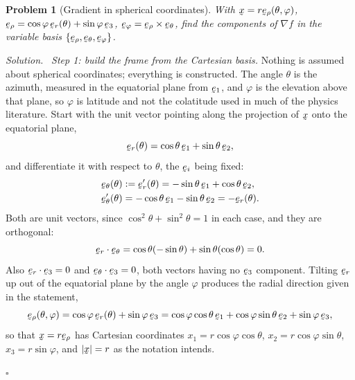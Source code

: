 \documentclass[17pt,a4paper]{extreport}
\DeclareRobustCommand{\vek}[1]{\underaccent{\tilde}{#1}}
\newcommand{\grad}{\nabla}
\newcommand{\bx}{\vek{x}}
\newcommand{\be}{\vek{e}}
\newcommand{\ber}{\vek{e}_{r}}
\renewcommand{\beth}{\vek{e}_{\theta}}
\newcommand{\beph}{\vek{e}_{\varphi}}
\newcommand{\berho}{\vek{e}_{\rho}}
\newcommand{\ip}[2]{#1\cdot#2}
\theoremstyle{scplain}
\theoremstyle{scdefn}
\theoremstyle{scplain}
\newtheorem{problem}{Problem}
\newenvironment{solution}
 {\par\smallskip\noindent\textit{Solution.}\ }
 {\hfill$\square$\par\medskip}
\begin{document}
\begin{problem}[Gradient in spherical coordinates]
With $\bx=r\berho(\theta,\varphi)$, $\berho=\cos\varphi\,\ber(\theta)
+\sin\varphi\,\be_3$, $\beph=\berho\times\beth$, find the components of
$\grad f$ in the variable basis $\{\berho,\beth,\beph\}$.
\end{problem}
\begin{solution}
\emph{Step 1: build the frame from the Cartesian basis.}
Nothing is assumed about spherical coordinates; everything is constructed.
The angle $\theta$ is the azimuth, measured in the equatorial plane from
$\be_{1}$, and $\varphi$ is the elevation above that plane, so $\varphi$ is
latitude and not the colatitude used in much of the physics literature.
Start with the unit vector pointing along the projection of $\bx$ onto the
equatorial plane,
\[
   \ber(\theta)=\cos\theta\,\be_{1}+\sin\theta\,\be_{2},
\]
and differentiate it with respect to $\theta$, the $\be_{i}$ being fixed:
\[
\begin{aligned}
   \beth(\theta)&:=\ber'(\theta)=-\sin\theta\,\be_{1}+\cos\theta\,\be_{2},\\
   \beth'(\theta)&=-\cos\theta\,\be_{1}-\sin\theta\,\be_{2}=-\ber(\theta).
\end{aligned}
\]
Both are unit vectors, since
$\cos^{2}\theta+\sin^{2}\theta=1$ in each case, and they are orthogonal:
\[
   \ip\ber\beth=\cos\theta(-\sin\theta)+\sin\theta(\cos\theta)=0 .
\]
Also $\ip\ber{\be_{3}}=0$ and $\ip\beth{\be_{3}}=0$, both vectors having no
$\be_{3}$ component. Tilting $\ber$ up out of the equatorial plane by the
angle $\varphi$ produces the radial direction given in the statement,
\[
   \berho(\theta,\varphi)=\cos\varphi\,\ber(\theta)+\sin\varphi\,\be_{3}
   =\cos\varphi\cos\theta\,\be_{1}+\cos\varphi\sin\theta\,\be_{2}
    +\sin\varphi\,\be_{3},
\]
so that $\bx=r\berho$ has Cartesian coordinates
$x_{1}=r\cos\varphi\cos\theta$, $x_{2}=r\cos\varphi\sin\theta$,
$x_{3}=r\sin\varphi$, and $|\bx|=r$ as the notation intends.


\end{solution}
\end{document}
